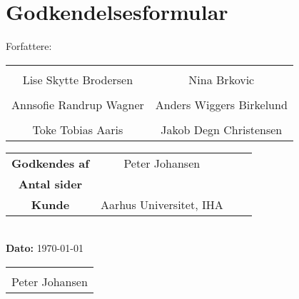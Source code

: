 \chapter{Godkendelsesformular}

{\large Forfattere:}
\\[5ex]


\begin{tabular}{c c}
\centering 
	\makebox[2.0in]{\hrulefill} & \makebox[2.0in]{\hrulefill}\\
	Lise Skytte Brodersen & Nina Brkovic\\[7ex]
	\makebox[2.0in]{\hrulefill} & \makebox[2.0in]{\hrulefill}\\
	Annsofie Randrup Wagner & Anders Wiggers Birkelund \\[7ex]
	\makebox[2.0in]{\hrulefill} & \makebox[2.0in]{\hrulefill}\\
	Toke Tobias Aaris & Jakob Degn Christensen\\[7ex]

\end{tabular}

\begin{tabular}{c c c c}
	\textbf{Godkendes af} & Peter Johansen\\[3ex]
	\textbf{Antal sider} & \pageref{LastPage} \\[3ex]
	\textbf{Kunde} & Aarhus Universitet, IHA
\end{tabular}\\[8ex]


\textbf{Dato:} {\today}
\\[5ex]

\begin{tabular}{c}
	\makebox[2.0in]{\hrulefill}\\
	\centering 
	Peter Johansen
	\end{tabular}

